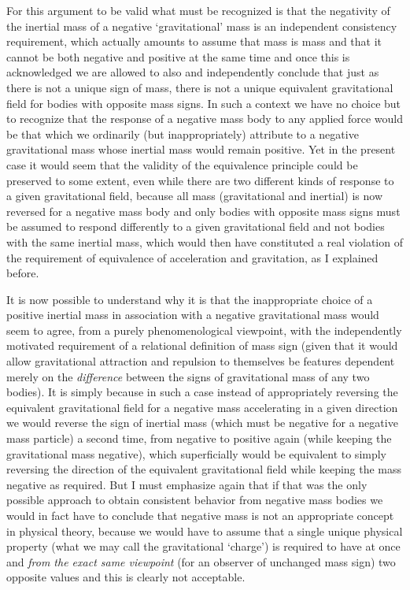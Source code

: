 \documentclass[notitlepage,12pt]{report}
\begin{document}
For this argument to be valid what must be recognized is that the negativity of the inertial mass of a negative `gravitational' mass is an independent consistency requirement, which actually amounts to assume that mass is mass and that it cannot be both negative and positive at the same time and once this is acknowledged we are allowed to also and independently conclude that just as there is not a unique sign of mass, there is not a unique equivalent gravitational field for bodies with opposite mass signs. In such a context we have no choice but to recognize that the response of a negative mass body to any applied force would be that which we ordinarily (but inappropriately) attribute to a negative gravitational mass whose inertial mass would remain positive. Yet in the present case it would seem that the validity of the equivalence principle could be preserved to some extent, even while there are two different kinds of response to a given gravitational field, because all mass (gravitational and inertial) is now reversed for a negative mass body and only bodies with opposite mass signs must be assumed to respond differently to a given gravitational field and not bodies with the same inertial mass, which would then have constituted a real violation of the requirement of equivalence of acceleration and gravitation, as I explained before.

It is now possible to understand why it is that the inappropriate choice of a positive inertial mass in association with a negative gravitational mass would seem to agree, from a purely phenomenological viewpoint, with the independently motivated requirement of a relational definition of mass sign (given that it would allow gravitational attraction and repulsion to themselves be features dependent merely on the \textit{difference} between the signs of gravitational mass of any two bodies). It is simply because in such a case instead of appropriately reversing the equivalent gravitational field for a negative mass accelerating in a given direction we would reverse the sign of inertial mass (which must be negative for a negative mass particle) a second time, from negative to positive again (while keeping the gravitational mass negative), which superficially would be equivalent to simply reversing the direction of the equivalent gravitational field while keeping the mass negative as required. But I must emphasize again that if that was the only possible approach to obtain consistent behavior from negative mass bodies we would in fact have to conclude that negative mass is not an appropriate concept in physical theory, because we would have to assume that a single unique physical property (what we may call the gravitational `charge') is required to have at once and \textit{from the exact same viewpoint} (for an observer of unchanged mass sign) two opposite values and this is clearly not acceptable.
\end{document}
